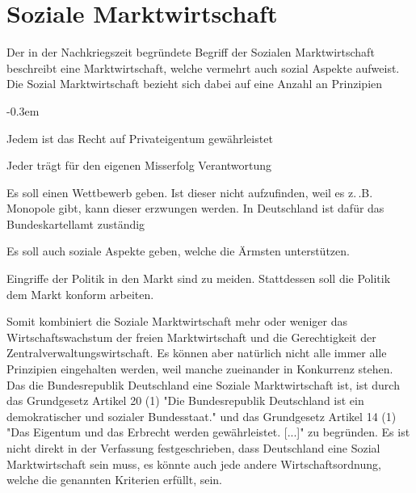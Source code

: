 \documentclass{article}
\begin{document}
 
 
\section{Soziale Marktwirtschaft}
\begin{multicols}{1}
\noindent Der in der Nachkriegszeit begründete Begriff der Sozialen Marktwirtschaft beschreibt eine Marktwirtschaft, welche vermehrt auch sozial Aspekte aufweist. \newline
Die Sozial Marktwirtschaft bezieht sich dabei auf eine Anzahl an Prinzipien
\begin{description}
 \itemsep-0.3em 
 \item[Eigentumsprinzip] Jedem ist das Recht auf Privateigentum gewährleistet 
 \item[Haftungsprinzip] Jeder trägt für den eigenen Misserfolg Verantwortung
 \item[Wettbewerbsprinzip] Es soll einen Wettbewerb geben. Ist dieser nicht aufzufinden, weil es z.\,.B. Monopole gibt, kann dieser erzwungen werden. In Deutschland ist dafür das Bundeskartellamt zuständig
 \item[Sozialprinzip] Es soll auch soziale Aspekte geben, welche die Ärmsten unterstützen.
 \item[Marktkonformitätsprinzip] Eingriffe der Politik in den Markt sind zu meiden. Stattdessen soll die Politik dem Markt konform arbeiten.
\end{description}
Somit kombiniert die Soziale Marktwirtschaft mehr oder weniger das Wirtschaftswachstum der freien Marktwirtschaft und die Gerechtigkeit der Zentralverwaltungswirtschaft. Es können aber natürlich nicht alle immer alle Prinzipien eingehalten werden, weil manche zueinander in Konkurrenz stehen. \newline 
Das die Bundesrepublik Deutschland eine Soziale Marktwirtschaft ist, ist durch das Grundgesetz Artikel 20 (1) "Die Bundesrepublik Deutschland ist ein demokratischer und sozialer Bundesstaat." und das Grundgesetz Artikel 14 (1) "Das Eigentum und das Erbrecht werden gewährleistet. [...]" zu begründen. Es ist nicht direkt in der Verfassung festgeschrieben, dass Deutschland eine Sozial Marktwirtschaft sein muss, es könnte auch jede andere Wirtschaftsordnung, welche die genannten Kriterien erfüllt, sein.
\end{multicols}
 
\end{document}
